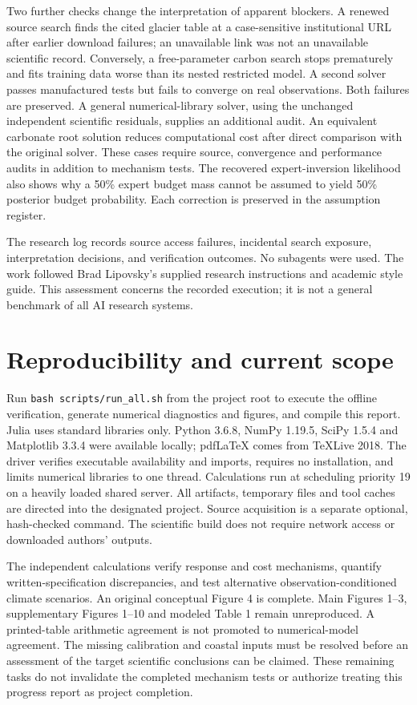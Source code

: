 \documentclass[11pt]{article}
\begin{document}
Two further checks change the interpretation of apparent blockers. A renewed
source search finds the cited glacier table at a case-sensitive institutional
URL after earlier download failures; an unavailable link was not an unavailable
scientific record. Conversely, a free-parameter carbon search stops prematurely
and fits training data worse than its nested restricted model. A second solver
passes manufactured tests but fails to converge on real observations. Both
failures are preserved. A general numerical-library solver, using the unchanged
independent scientific residuals, supplies an additional audit. An equivalent
carbonate root solution reduces computational cost after direct comparison with
the original solver. These cases require source, convergence and performance
audits in addition to mechanism tests. The recovered expert-inversion likelihood also shows why a
50\% expert budget mass cannot be assumed to yield 50\% posterior budget
probability. Each correction is preserved in the assumption register.

The research log records source access failures, incidental search exposure,
interpretation decisions, and verification outcomes. No subagents were used.
The work followed Brad Lipovsky's supplied research instructions and academic
style guide. This assessment concerns the recorded execution; it is not a
general benchmark of all AI research systems.

\section{Reproducibility and current scope}

Run \texttt{bash scripts/run\_all.sh} from the project root to execute the
offline verification, generate numerical diagnostics and figures, and compile
this report. Julia uses standard libraries only. Python 3.6.8, NumPy 1.19.5,
SciPy 1.5.4 and Matplotlib 3.3.4 were available locally; pdfLaTeX comes from
TeXLive 2018. The driver verifies executable availability and imports, requires
no installation, and limits numerical libraries to one thread. Calculations
run at scheduling priority 19 on a heavily loaded shared server. All artifacts,
temporary files and tool caches are directed into the designated project.
Source acquisition is a separate optional, hash-checked command. The scientific
build does not require network access or downloaded authors' outputs.

The independent calculations verify response and cost mechanisms, quantify
written-specification discrepancies, and test alternative observation-conditioned
climate scenarios. An original conceptual
Figure 4 is complete. Main Figures 1--3, supplementary Figures 1--10 and modeled
Table 1 remain unreproduced. A printed-table arithmetic agreement is not promoted
to numerical-model agreement. The missing calibration and coastal inputs must
be resolved before an assessment of the target scientific conclusions can be
claimed. These remaining tasks do not invalidate the completed mechanism tests
or authorize treating this progress report as project completion.
\end{document}
